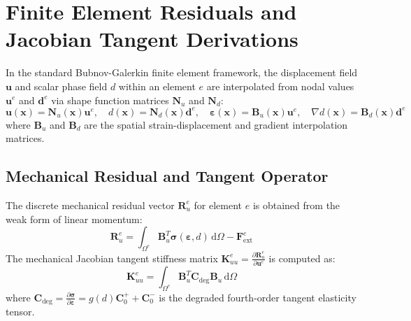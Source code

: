 \documentclass[11pt,a4paper]{report}
\begin{document}
\section{Finite Element Residuals and Jacobian Tangent Derivations}
In the standard Bubnov-Galerkin finite element framework, the displacement field $\mathbf{u}$ and scalar phase field $d$ within an element $e$ are interpolated from nodal values $\mathbf{u}^e$ and $\mathbf{d}^e$ via shape function matrices $\mathbf{N}_u$ and $\mathbf{N}_d$:
\begin{equation}
\mathbf{u}(\mathbf{x}) = \mathbf{N}_u(\mathbf{x}) \mathbf{u}^e, \quad d(\mathbf{x}) = \mathbf{N}_d(\mathbf{x}) \mathbf{d}^e, \quad \boldsymbol{\varepsilon}(\mathbf{x}) = \mathbf{B}_u(\mathbf{x}) \mathbf{u}^e, \quad \nabla d(\mathbf{x}) = \mathbf{B}_d(\mathbf{x}) \mathbf{d}^e
\end{equation}
where $\mathbf{B}_u$ and $\mathbf{B}_d$ are the spatial strain-displacement and gradient interpolation matrices.

\subsection{Mechanical Residual and Tangent Operator}
The discrete mechanical residual vector $\mathbf{R}_u^e$ for element $e$ is obtained from the weak form of linear momentum:
\begin{equation}
\label{eq:res_u}
\mathbf{R}_u^e = \int_{\Omega^e} \mathbf{B}_u^T \boldsymbol{\sigma}(\boldsymbol{\varepsilon}, d) \, \mathrm{d}\Omega - \mathbf{F}_{\text{ext}}^e
\end{equation}
The mechanical Jacobian tangent stiffness matrix $\mathbf{K}_{uu}^e = \frac{\partial \mathbf{R}_u^e}{\partial \mathbf{u}^e}$ is computed as:
\begin{equation}
\label{eq:tan_u}
\mathbf{K}_{uu}^e = \int_{\Omega^e} \mathbf{B}_u^T \mathbf{C}_{\text{deg}} \mathbf{B}_u \, \mathrm{d}\Omega
\end{equation}
where $\mathbf{C}_{\text{deg}} = \frac{\partial \boldsymbol{\sigma}}{\partial \boldsymbol{\varepsilon}} = g(d) \mathbf{C}_0^+ + \mathbf{C}_0^-$ is the degraded fourth-order tangent elasticity tensor.
\end{document}
